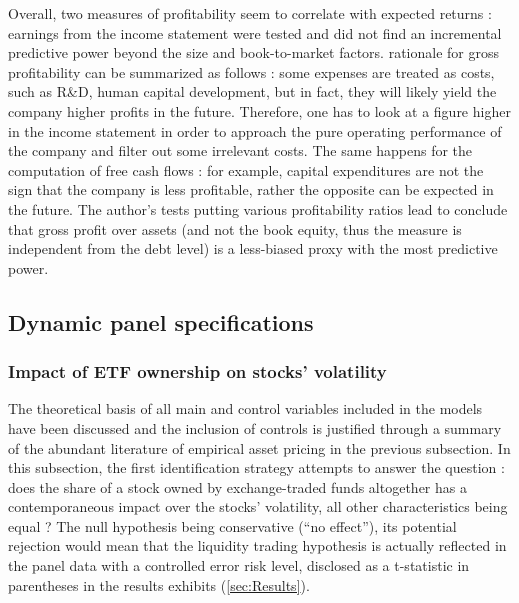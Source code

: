 Overall, two measures of profitability seem to correlate with expected returns : earnings from the income statement were tested and \textcite{Fama2006} did not find an incremental predictive power beyond the size and book-to-market factors. \textcite{Novy-Marx2013} rationale for gross profitability can be summarized as follows : some expenses are treated as costs, such as R\&D, human capital development, but in fact, they will likely yield the company higher profits in the future. Therefore, one has to look at a figure higher in the income statement in order to approach the pure operating performance of the company and filter out some irrelevant costs. The same happens for the computation of free cash flows : for example, capital expenditures are not the sign that the company is less profitable, rather the opposite can be expected in the future. The author's tests putting various profitability ratios lead to conclude that gross profit over assets (and not the book equity, thus the measure is independent from the debt level) is a less-biased proxy with the most predictive power.


\subsection{Dynamic panel specifications}
\subsubsection{Impact of ETF ownership on stocks' volatility}
\label{subsec:Method:Volatility}
The theoretical basis of all main and control variables included in the models have been discussed and the inclusion of controls is justified through a summary of the abundant literature of empirical asset pricing in the previous subsection. In this subsection, the first identification strategy attempts to answer the question : does the share of a stock owned by exchange-traded funds altogether has a contemporaneous impact over the stocks' volatility, all other characteristics being equal ? The null hypothesis being conservative (``no effect''), its potential rejection would mean that the liquidity trading hypothesis is actually reflected in the panel data with a controlled error risk level, disclosed as a t-statistic in parentheses in the results exhibits (\autoref{sec:Results}).

